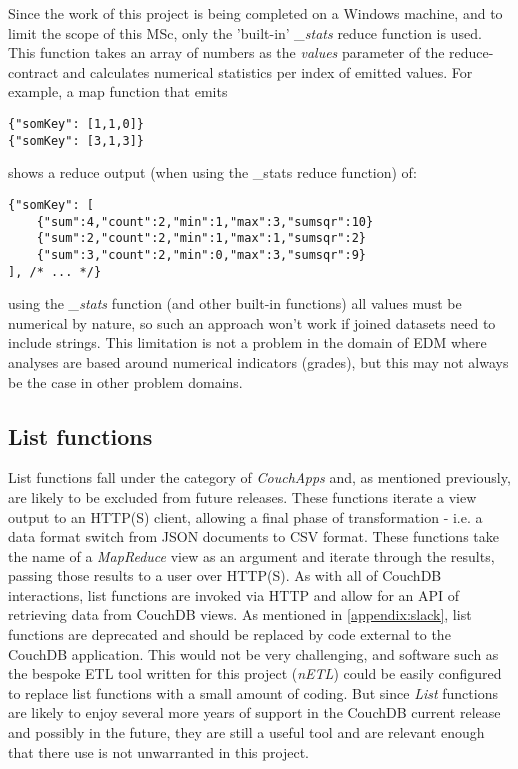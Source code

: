 Since the work of this project is being completed on a Windows machine, and to limit the scope of this MSc, only the 'built-in' \textit{\_stats} reduce function is used. This function takes an array of numbers as the \textit{values} parameter of the reduce-contract and calculates numerical statistics per index of emitted values. For example, a map function that emits

\begin{verbatim}
{"somKey": [1,1,0]}
{"somKey": [3,1,3]}
\end{verbatim}

shows a reduce output (when using the \_stats reduce function) of:

\begin{verbatim}
{"somKey": [
    {"sum":4,"count":2,"min":1,"max":3,"sumsqr":10}
    {"sum":2,"count":2,"min":1,"max":1,"sumsqr":2}
    {"sum":3,"count":2,"min":0,"max":3,"sumsqr":9}
], /* ... */}
\end{verbatim}

using the \textit{\_stats} function (and other built-in functions) all values must be numerical by nature, so such an approach won't work if joined datasets need to include strings. This limitation is not a problem in the domain of EDM where analyses are based around numerical indicators (grades), but this may not always be the case in other problem domains.

\subsection{List functions}
List functions fall under the category of \textit{CouchApps} and, as mentioned previously, are likely to be excluded from future releases. These functions iterate a view output to an HTTP(S) client, allowing a final phase of transformation - i.e. a data format switch from JSON documents to CSV format. These  functions take the name of a \textit{MapReduce} view as an argument and iterate through the results, passing those results to a user over HTTP(S). As with all of CouchDB interactions, list functions are invoked via HTTP and allow for an API of retrieving data from CouchDB views. As mentioned in \ref{appendix:slack}, list functions are deprecated and should be replaced by code external to the CouchDB application. This would not be very challenging, and software such as the bespoke ETL tool written for this project (\textit{nETL}) could be easily configured to replace list functions with a small amount of coding. But since \textit{List} functions are likely to enjoy several more years of support in the CouchDB current release and possibly in the future, they are still a useful tool and are relevant enough that there use is not unwarranted in this project.